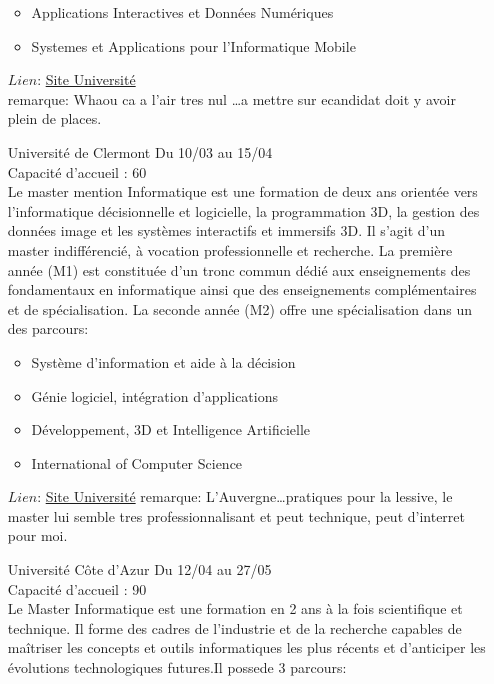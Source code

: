 \documentclass[a4paper,11pt]{article}
\begin{document}
\begin{enumerate}
                \begin{itemize}
                    \item Applications Interactives et Données Numériques
                    \item Systemes et Applications pour l'Informatique Mobile
                \end{itemize}
                $Lien$: \href{http://www-informatique.univ-ubs.fr/master-info/index.shtml}{Site Université}
                \\remarque: Whaou ca a l'air tres nul \ldots a mettre sur ecandidat doit y avoir plein de places.
\\
        \item [\color{LightOrangeHaf}Université de Clermont] Du 10/03 au 15/04
                \\Capacité d'accueil : 60
                \\Le master mention Informatique est une formation de deux ans orientée vers l'informatique décisionnelle et logicielle, la programmation 3D, la gestion des données image et les systèmes interactifs et immersifs 3D. Il s’agit d’un master indifférencié, à vocation professionnelle et recherche. La première année (M1) est constituée d'un tronc commun dédié aux enseignements des fondamentaux en informatique ainsi que des enseignements complémentaires et de spécialisation. La seconde année (M2) offre une spécialisation dans un des parcours:
                \begin{itemize}
                    \item Système d'information et aide à la décision
                    \item Génie logiciel, intégration d’applications
                    \item Développement, 3D et Intelligence Artificielle
                    \item International of Computer Science
                \end{itemize}
                $Lien$: \href{https://www.uca.fr/formation/nos-formations/catalogue-des-formations/master-info}{Site Université}
                remarque: L'Auvergne\dots pratiques pour la lessive, le master lui semble tres professionnalisant et peut technique, peut d'interret pour moi.
\\
        \item [\color{LightOrangeHaf}Université  Côte d'Azur] Du 12/04 au 27/05
                \\Capacité d'accueil : 90
                \\Le Master Informatique est une formation en 2 ans à la fois scientifique et technique. Il forme des cadres de l’industrie et de la recherche capables de maîtriser les concepts et outils informatiques les plus récents et d’anticiper les évolutions technologiques futures.Il possede 3 parcours:

\end{enumerate}
\end{document}
